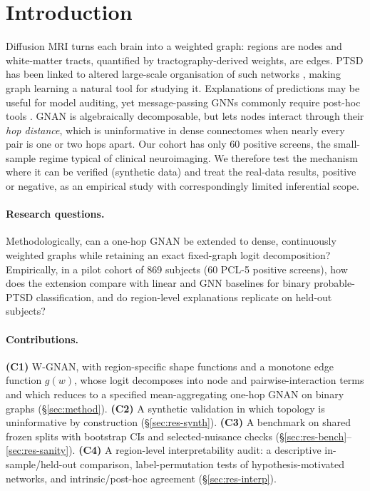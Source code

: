 \section{Introduction}
\label{sec:intro}

Diffusion MRI turns each brain into a weighted graph: regions are nodes and white-matter tracts,
quantified by tractography-derived weights, are edges. PTSD has been linked to altered large-scale organisation
of such networks \citep{suo2017smallworld,akiki2017network}, making graph learning a natural tool
for studying it. Explanations of predictions may be useful for model auditing, yet message-passing
GNNs \citep{kipf2017gcn,velickovic2018gat} commonly require post-hoc tools
\citep{ying2019gnnexplainer}. GNAN \citep{bechler2024gnan} is algebraically decomposable,
but lets nodes interact through their \emph{hop distance}, which is uninformative in dense
connectomes when nearly every pair is one or two hops apart. Our cohort has only 60 positive screens,
the small-sample regime typical of clinical neuroimaging. We therefore test the mechanism where it
can be verified (synthetic data) and treat the real-data results, positive or negative, as an
empirical study with correspondingly limited inferential scope.

\paragraph{Research questions.} Methodologically, can a one-hop GNAN be extended to dense,
continuously weighted graphs while retaining an exact fixed-graph logit decomposition? Empirically,
in a pilot cohort of 869 subjects (60 PCL-5 positive screens), how does the extension compare with
linear and GNN baselines for binary probable-PTSD classification, and do region-level explanations
replicate on held-out subjects?

\paragraph{Contributions.}
\textbf{(C1)} W-GNAN, with region-specific shape functions and a monotone edge function $g(w)$,
whose logit decomposes into node and pairwise-interaction terms and which reduces to a specified
mean-aggregating one-hop GNAN on binary graphs (\S\ref{sec:method}).
\textbf{(C2)} A synthetic validation in which topology is uninformative by construction
(\S\ref{sec:res-synth}).
\textbf{(C3)} A benchmark on shared frozen splits with bootstrap CIs and selected-nuisance checks
(\S\ref{sec:res-bench}--\ref{sec:res-sanity}).
\textbf{(C4)} A region-level interpretability audit: a descriptive in-sample/held-out comparison,
label-permutation tests of hypothesis-motivated networks, and intrinsic/post-hoc agreement
(\S\ref{sec:res-interp}).
